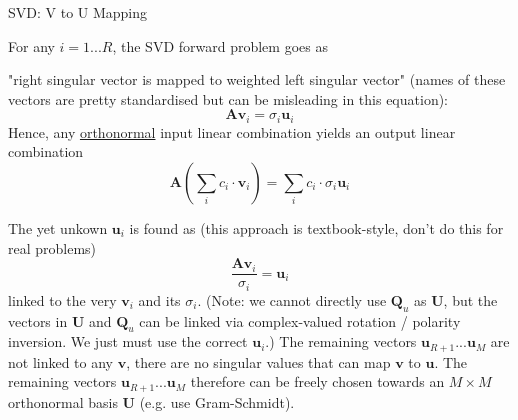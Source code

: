 \documentclass[mathserif, aspectratio=1610]{intbeamer}
\begin{document}
\begin{frame}{SVD: V to U Mapping}

For any $i=1...R$, the SVD forward problem goes as

"right singular vector is mapped to weighted left singular vector" (names of these vectors are pretty standardised but can be misleading in this equation):
$$\bm{A} \bm{v}_i = \sigma_i \bm{u}_i$$
Hence, any \underline{orthonormal} input linear combination yields an output linear combination
$$\bm{A} \left(\sum_i c_i \cdot \bm{v}_i\right) = \sum_i c_i \cdot \sigma_i \bm{u}_i$$

The yet unkown $\bm{u}_i$ is found as (this approach is textbook-style, don't do this for real problems)
$$\frac{\bm{A} \bm{v}_i}{\sigma_i} = \bm{u}_i$$
linked to the very $\bm{v}_i$ and its $\sigma_i$. (Note: we cannot directly use $\bm{Q}_u$ as $\bm{U}$, but the vectors in $\bm{U}$ and $\bm{Q}_u$ can be linked via
complex-valued rotation / polarity inversion. We just must use the correct $\bm{u}_i$.)
%
The remaining vectors $\bm{u}_{R+1}...\bm{u}_{M}$ are not linked to any $\bm{v}$, there are no singular values that can map $\bm{v}$ to $\bm{u}$.
The remaining vectors $\bm{u}_{R+1}...\bm{u}_{M}$ therefore can be freely chosen
towards an $M \times M$ orthonormal basis $\bm{U}$ (e.g. use Gram-Schmidt).

\end{frame}
\end{document}
